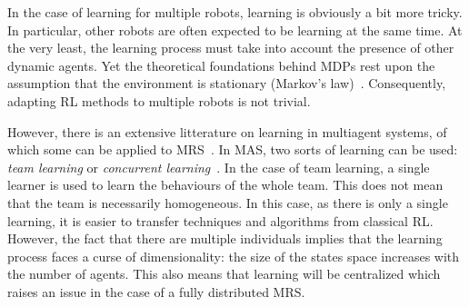     In the case of learning for multiple robots, learning is obviously a bit more tricky. In particular, other robots are often expected to be learning at the same time. At the very least, the learning process must take into account the presence of other dynamic agents. Yet the theoretical foundations behind MDPs rest upon the assumption that the environment is stationary (Markov's law)~\parencite{Littman1994, Parker2008}. Consequently, adapting RL methods to multiple robots is not trivial.

    However, there is an extensive litterature on learning in multiagent systems, of which some can be applied to MRS~\parencite{Stone2000, Yang2005, Panait2005}. In MAS, two sorts of learning can be used: \emph{team learning} or \emph{concurrent learning}~\parencite{Panait2005}. In the case of team learning, a single learner is used to learn the behaviours of the whole team. This does not mean that the team is necessarily homogeneous. In this case, as there is only a single learning, it is easier to transfer techniques and algorithms from classical RL. However, the fact that there are multiple individuals implies that the learning process faces a curse of dimensionality: the size of the states space increases with the number of agents. This also means that learning will be centralized which raises an issue in the case of a fully distributed MRS. 

